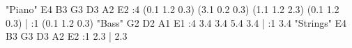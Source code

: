 \track "Piano"  \tuning E4 B3 G3 D3 A2 E2
:4 (0.1 1.2 0.3) (3.1 0.2 0.3) (1.1 1.2 2.3) (0.1 1.2 0.3) | :1 (0.1 1.2 0.3)
\track "Bass"  \tuning G2 D2 A1 E1
:4 3.4 3.4 5.4 3.4 | :1 3.4
\track "Strings"  \tuning E4 B3 G3 D3 A2 E2
:1 2.3 | 2.3
